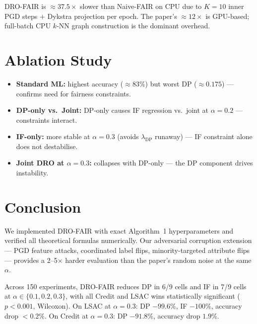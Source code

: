 \documentclass[11pt,a4paper]{article}
\newcommand{\lDP}{\lambda_{\mathrm{DP}}}
\begin{document}
DRO-FAIR is $\approx37.5\times$ slower than Naive-FAIR on CPU due to $K=10$
inner PGD steps $+$ Dykstra projection per epoch.  The paper's
$\approx12\times$ is GPU-based; full-batch CPU $k$-NN graph construction is
the dominant overhead.

\section{Ablation Study}



\begin{itemize}
\item \textbf{Standard ML:} highest accuracy ($\approx83\%$) but worst DP
  ($\approx0.175$) --- confirms need for fairness constraints.
\item \textbf{DP-only vs.\ Joint:} DP-only causes IF regression vs.\ joint at
  $\alpha=0.2$ --- constraints interact.
\item \textbf{IF-only:} more stable at $\alpha=0.3$ (avoids $\lDP$ runaway)
  --- IF constraint alone does not destabilise.
\item \textbf{Joint DRO at $\alpha=0.3$:} collapses with DP-only --- the DP
  component drives instability.
\end{itemize}

\section{Conclusion}

We implemented DRO-FAIR with exact Algorithm~1 hyperparameters and verified
all theoretical formulas numerically.  Our adversarial corruption extension
--- PGD feature attacks, coordinated label flips, minority-targeted attribute
flips --- provides a 2--5$\times$ harder evaluation than the paper's random
noise at the same $\alpha$.

Across 150 experiments, DRO-FAIR reduces DP in 6/9 cells and IF in 7/9 cells
at $\alpha\in\{0.1,0.2,0.3\}$, with all Credit and LSAC wins statistically
significant ($p{<}0.001$, Wilcoxon).  On LSAC at $\alpha=0.3$: DP $-99.6\%$,
IF $-100\%$, accuracy drop $<0.2\%$.  On Credit at $\alpha=0.3$: DP $-91.8\%$,
accuracy drop $1.9\%$.
\end{document}
